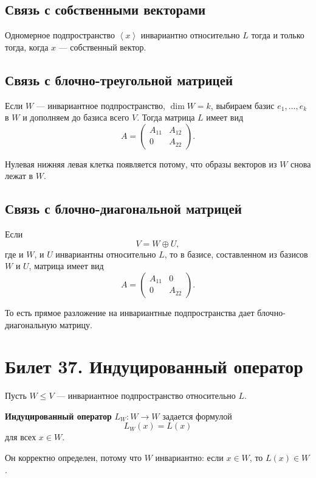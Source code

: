 \documentclass[12pt,a4paper]{article}
\newcommand{\Lin}[1]{\left\langle #1 \right\rangle}
\begin{document}
\subsection*{Связь с собственными векторами}

Одномерное подпространство $\Lin{x}$ инвариантно относительно $L$ тогда и только тогда, когда $x$ --- собственный вектор.

\subsection*{Связь с блочно-треугольной матрицей}

Если $W$ --- инвариантное подпространство, $\dim W=k$, выбираем базис $e_1,\ldots,e_k$ в $W$ и дополняем до базиса всего $V$. Тогда матрица $L$ имеет вид
\[
    A=
    \begin{pmatrix}
        A_{11} & A_{12}\\
        0 & A_{22}
    \end{pmatrix}.
\]

Нулевая нижняя левая клетка появляется потому, что образы векторов из $W$ снова лежат в $W$.

\subsection*{Связь с блочно-диагональной матрицей}

Если
\[
    V=W\oplus U,
\]
где и $W$, и $U$ инвариантны относительно $L$, то в базисе, составленном из базисов $W$ и $U$, матрица имеет вид
\[
    A=
    \begin{pmatrix}
        A_{11} & 0\\
        0 & A_{22}
    \end{pmatrix}.
\]

То есть прямое разложение на инвариантные подпространства дает блочно-диагональную матрицу.

\section{Билет 37. Индуцированный оператор}

Пусть $W\le V$ --- инвариантное подпространство относительно $L$.

\textbf{Индуцированный оператор} $L_W:W\to W$ задается формулой
\[
    L_W(x)=L(x)
\]
для всех $x\in W$.

Он корректно определен, потому что $W$ инвариантно: если $x\in W$, то $L(x)\in W$.
\end{document}
